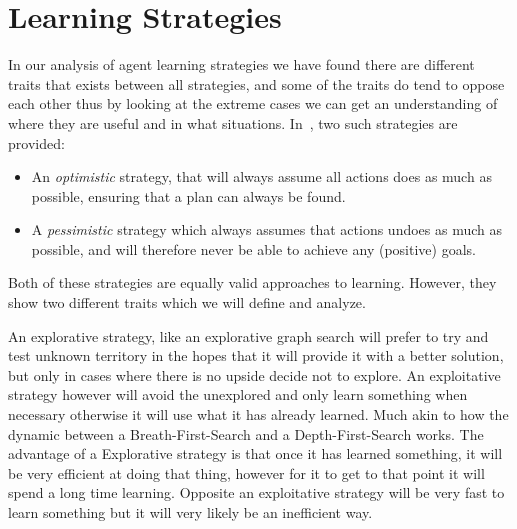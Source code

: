 \documentclass[\master/Master.tex]{subfiles}
\begin{document}
    \section*{Learning Strategies}\label{sec:strats}


	In our analysis of agent learning strategies we have found there are different traits that exists between all strategies, and some of the traits do tend to oppose each other thus by looking at the extreme cases we can get an understanding of where they are useful and in what situations. In~\cite{Walsh2008}, two such strategies are provided:
    \begin{itemize}
    \item An \emph{optimistic} strategy, that will always assume all actions
    does as much as possible, ensuring that a plan can always be found.
    \item A \emph{pessimistic} strategy which always assumes that actions undoes
    as much as possible, and will therefore never be able to achieve any (positive)
    goals.
    \end{itemize}
    Both of these strategies are equally valid approaches to learning.
    However, they show two different traits which we will define and analyze.
    \begin{definition}
     An explorative strategy, like an explorative graph search will prefer to try and test unknown territory in the hopes that it will provide it with a better solution, but only in cases where there is no upside decide not to explore.
    An exploitative strategy however will avoid the unexplored and only learn something when necessary otherwise it will use what it has already learned. Much akin to how the dynamic between a Breath-First-Search and a Depth-First-Search works. The advantage of a Explorative strategy is that once it has learned something, it will be very efficient at doing that thing, however for it to get to that point it will spend a long time learning. Opposite an exploitative strategy will be very fast to learn something but it will very likely be an inefficient way.
	\end{definition}
\end{document}
